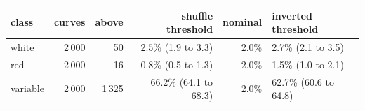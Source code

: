 \begin{tabular}{lrrrrl}
\toprule
class & curves & above & shuffle threshold & nominal & inverted threshold \\
\midrule
white & 2\,000 & 50 & 2.5\% (1.9 to 3.3) & 2.0\% & 2.7\% (2.1 to 3.5) \\
red & 2\,000 & 16 & 0.8\% (0.5 to 1.3) & 2.0\% & 1.5\% (1.0 to 2.1) \\
variable & 2\,000 & 1\,325 & 66.2\% (64.1 to 68.3) & 2.0\% & 62.7\% (60.6 to 64.8) \\
\bottomrule
\end{tabular}
